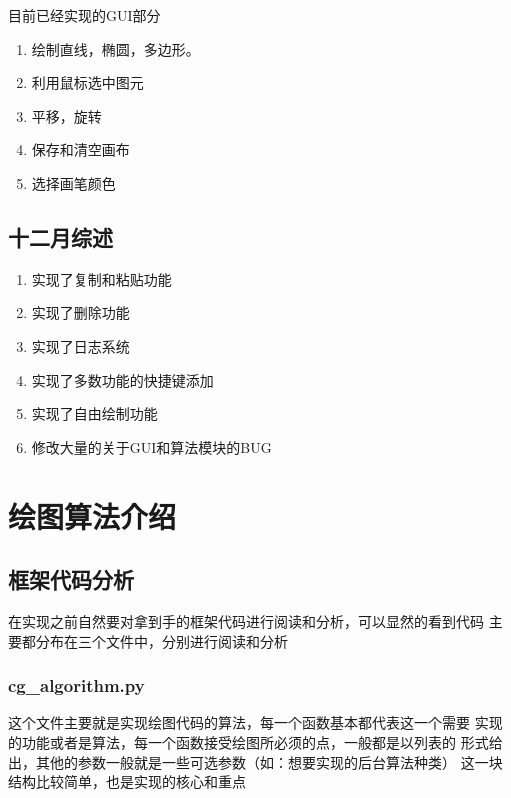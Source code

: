 \documentclass[a4paper,UTF8]{article}
\theoremstyle{definition}
\begin{document}
目前已经实现的GUI部分
\begin{enumerate}
    \item 绘制直线，椭圆，多边形。
    
    \item 利用鼠标选中图元
    
    \item 平移，旋转
    
    \item 保存和清空画布
    
    \item 选择画笔颜色
\end{enumerate}

\subsection{十二月综述}
\begin{enumerate}
    \item 实现了复制和粘贴功能
    \item 实现了删除功能
    \item 实现了日志系统
    \item 实现了多数功能的快捷键添加
    \item 实现了自由绘制功能
    \item 修改大量的关于GUI和算法模块的BUG
\end{enumerate}

\section{绘图算法介绍}
\subsection{框架代码分析}
在实现之前自然要对拿到手的框架代码进行阅读和分析，可以显然的看到代码
主要都分布在三个文件中，分别进行阅读和分析
\subsubsection{cg\_algorithm.py}
这个文件主要就是实现绘图代码的算法，每一个函数基本都代表这一个需要
实现的功能或者是算法，每一个函数接受绘图所必须的点，一般都是以列表的
形式给出，其他的参数一般就是一些可选参数（如：想要实现的后台算法种类）
这一块结构比较简单，也是实现的核心和重点
\end{document}
